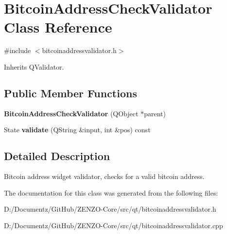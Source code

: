 \hypertarget{class_bitcoin_address_check_validator}{}\section{Bitcoin\+Address\+Check\+Validator Class Reference}
\label{class_bitcoin_address_check_validator}


{\ttfamily \#include $<$bitcoinaddressvalidator.\+h$>$}



Inherits Q\+Validator.

\subsection*{Public Member Functions}
\begin{DoxyCompactItemize}
\item 
\mbox{\label{class_bitcoin_address_check_validator_ad546bb34a6980e73f9896f89cdfe6699}} 
{\bfseries Bitcoin\+Address\+Check\+Validator} (Q\+Object $\ast$parent)
\item 
\mbox{\label{class_bitcoin_address_check_validator_a9f1a2f3d85862d0ecf65749d1fa697d1}} 
State {\bfseries validate} (Q\+String \&input, int \&pos) const
\end{DoxyCompactItemize}


\subsection{Detailed Description}
Bitcoin address widget validator, checks for a valid bitcoin address. 

The documentation for this class was generated from the following files\+:\begin{DoxyCompactItemize}
\item 
D\+:/\+Documentz/\+Git\+Hub/\+Z\+E\+N\+Z\+O-\/\+Core/src/qt/bitcoinaddressvalidator.\+h\item 
D\+:/\+Documentz/\+Git\+Hub/\+Z\+E\+N\+Z\+O-\/\+Core/src/qt/bitcoinaddressvalidator.\+cpp\end{DoxyCompactItemize}
